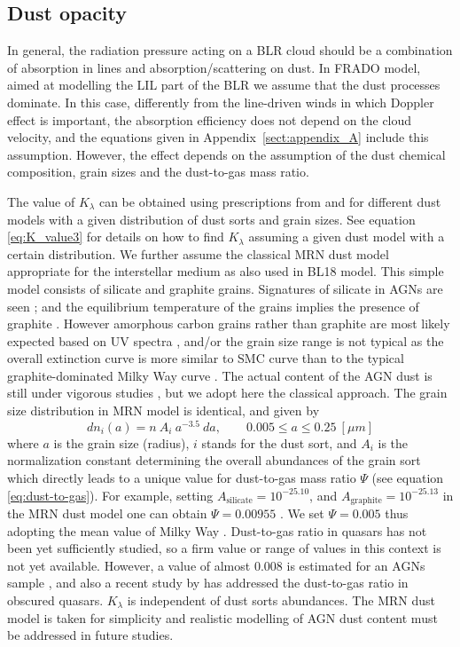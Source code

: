\documentclass[twocolumn]{aastex62}
\begin{document}
\subsection{Dust opacity} \label{sec:dust}

In general, the radiation pressure acting on a BLR cloud should be a combination of absorption in lines and absorption/scattering on dust. In FRADO model, aimed at modelling the LIL part of the BLR we assume that the dust processes dominate. In this case, differently from the line-driven winds in which Doppler effect is important, the absorption efficiency does not depend on the cloud velocity, and the equations given in Appendix~\ref{sect:appendix_A} include this assumption. However, the effect depends on the assumption of the dust chemical composition, grain sizes and the dust-to-gas mass ratio.

The value of $K_{\lambda}$ can be obtained using prescriptions from \cite{rollig2013} and \cite{Szczerba1997} for different dust models  with a given distribution of dust sorts and grain sizes. See equation \ref{eq:K_value3} for details on how to find $K_{\lambda}$ assuming a given dust model with a certain distribution.
We further assume the classical MRN dust model appropriate for the interstellar medium \citep{mathis1977} as also used in BL18 model.
This simple model consists of silicate and graphite grains.
Signatures of silicate in AGNs are seen \citep{netzer2007}; and the equilibrium temperature of the grains implies the presence of graphite \citep{clavel1989}. However amorphous carbon grains rather than graphite are most likely expected based on UV spectra \citep{Czerny2004}, and/or the grain size range is not typical \citep{gaskell2004} as the overall extinction curve is more similar to SMC curve than to the typical graphite-dominated Milky Way curve \citep[e.g.][]{richards2003,hopkins2004,zafar2015}. The actual content of the AGN dust is still under vigorous studies \citep{giang2020}, but we adopt here the classical approach.
The grain size distribution in MRN model is identical, and given by
\begin{equation}
dn_{i}(a) = n\ A_{i}\ a^{-3.5} \ da  , \qquad 0.005 \leq a \leq 0.25\ [\mu m]
\end{equation}
where $a$ is the grain size (radius), $i$ stands for the dust sort, and $A_{i}$ is the normalization constant determining the overall abundances of the grain sort which directly leads to a unique value for dust-to-gas mass ratio $\Psi$ (see equation \ref{eq:dust-to-gas}). For example, setting $A_{\mathrm{silicate}}=10^{-25.10}$, and $A_{\mathrm{graphite}}=10^{-25.13}$ \citep{WG2001b} in the MRN dust model one can obtain $\Psi = 0.00955$ \citep{rollig2013}. We set $\Psi=0.005$ thus adopting the mean value of Milky Way \citep{mathis1977}. Dust-to-gas ratio in quasars has not been yet sufficiently studied, so a firm value or range of values in this context is not yet available. However, a value of almost $0.008$ is estimated for an AGNs sample \citep{Shangguan2018}, and also a recent study by \citet{Jun2020} has addressed the dust-to-gas ratio in obscured quasars. $K_{\lambda}$ is independent of dust sorts abundances. The MRN dust model is taken for simplicity and realistic modelling of AGN dust content must be addressed in future studies.
\end{document}
